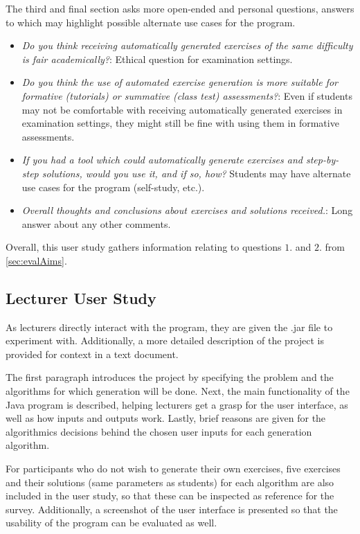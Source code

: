 \documentclass{l4proj}
\begin{document}
The third and final section asks more open-ended and personal questions, answers to which may highlight possible alternate use cases for the program.

\begin{itemize}
	\item
	\emph{Do you think receiving automatically generated exercises of the same difficulty is fair academically?}: Ethical question for examination settings.
	\item
	\emph{Do you think the use of automated exercise generation is more suitable for formative (tutorials) or summative (class test) assessments?}: Even if students may not be comfortable with receiving automatically generated exercises in examination settings, they might still be fine with using them in formative assessments.
	\item
	\emph{If you had a tool which could automatically generate exercises and step-by-step solutions, would you use it, and if so, how?} Students may have alternate use cases for the program (self-study, etc.).
	\item
	\emph{Overall thoughts and conclusions about exercises and solutions received.}: Long answer about any other comments.
\end{itemize}

Overall, this user study gathers information relating to questions $1.$ and $2.$ from \autoref{sec:evalAims}.

\subsection{Lecturer User Study}

As lecturers directly interact with the program, they are given the .jar file to experiment with. Additionally, a more detailed description of the project is provided for context in a text document.

The first paragraph introduces the project by specifying the problem and the algorithms for which generation will be done. Next, the main functionality of the Java program is described, helping lecturers get a grasp for the user interface, as well as how inputs and outputs work. Lastly, brief reasons are given for the algorithmics decisions behind the chosen user inputs for each generation algorithm.

For participants who do not wish to generate their own exercises, five exercises and their solutions (same parameters as students) for each algorithm are also included in the user study, so that these can be inspected as reference for the survey. Additionally, a screenshot of the user interface is presented so that the usability of the program can be evaluated as well.
\end{document}
